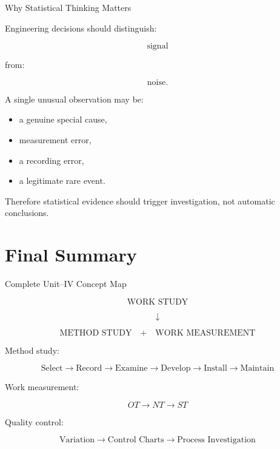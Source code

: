 \documentclass[aspectratio=169,10pt]{beamer}
\begin{document}
\begin{frame}[shrink=18]{Why Statistical Thinking Matters}
\small

Engineering decisions should distinguish:

\[
\text{signal}
\]

from:

\[
\text{noise}.
\]

A single unusual observation may be:

\begin{itemize}
    \item a genuine special cause,
    \item measurement error,
    \item a recording error,
    \item a legitimate rare event.
\end{itemize}

Therefore statistical evidence should trigger investigation,
not automatic conclusions.

\end{frame}


\section{Final Summary}

\begin{frame}[shrink=18]{Complete Unit--IV Concept Map}
\small

\[
\boxed{
\text{WORK STUDY}
}
\]

\[
\downarrow
\]

\[
\boxed{
\text{METHOD STUDY}
}
\quad+\quad
\boxed{
\text{WORK MEASUREMENT}
}
\]

\vspace{5pt}

Method study:

\[
\text{Select}\rightarrow\text{Record}\rightarrow\text{Examine}
\rightarrow\text{Develop}\rightarrow\text{Install}\rightarrow\text{Maintain}
\]

\vspace{5pt}

Work measurement:

\[
OT\rightarrow NT\rightarrow ST
\]

\vspace{5pt}

Quality control:

\[
\text{Variation}
\rightarrow
\text{Control Charts}
\rightarrow
\text{Process Investigation}
\]

\end{frame}
\end{document}
